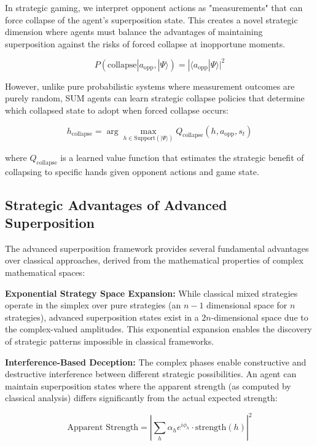 \documentclass[11pt,a4paper]{article}
\begin{document}
In strategic gaming, we interpret opponent actions as "measurements" that can force collapse of the agent's superposition state. This creates a novel strategic dimension where agents must balance the advantages of maintaining superposition against the risks of forced collapse at inopportune moments.

\begin{equation}
P(\text{collapse}|a_{\text{opp}}, |\Psi\rangle) = |\langle a_{\text{opp}} | \Psi \rangle|^2
\end{equation}

However, unlike pure probabilistic systems where measurement outcomes are purely random, SUM agents can learn strategic collapse policies that determine which collapsed state to adopt when forced collapse occurs:

\begin{equation}
h_{\text{collapse}} = \arg\max_{h \in \text{Support}(|\Psi\rangle)} Q_{\text{collapse}}(h, a_{\text{opp}}, s_t)
\end{equation}

where $Q_{\text{collapse}}$ is a learned value function that estimates the strategic benefit of collapsing to specific hands given opponent actions and game state.

\subsection{Strategic Advantages of Advanced Superposition}

The advanced superposition framework provides several fundamental advantages over classical approaches, derived from the mathematical properties of complex mathematical spaces:

\textbf{Exponential Strategy Space Expansion:} While classical mixed strategies operate in the simplex over pure strategies (an $n-1$ dimensional space for $n$ strategies), advanced superposition states exist in a $2n$-dimensional space due to the complex-valued amplitudes. This exponential expansion enables the discovery of strategic patterns impossible in classical frameworks.

\textbf{Interference-Based Deception:} The complex phases enable constructive and destructive interference between different strategic possibilities. An agent can maintain superposition states where the apparent strength (as computed by classical analysis) differs significantly from the actual expected strength:

\begin{equation}
\text{Apparent Strength} = \left|\sum_{h} \alpha_h e^{i\phi_h} \cdot \text{strength}(h)\right|^2
\end{equation}
\end{document}
